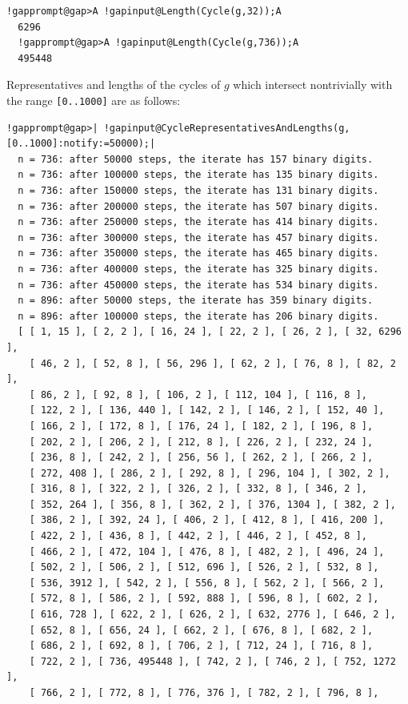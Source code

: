 \documentclass[a4paper,11pt]{report}
\begin{document}
{{\begin{Verbatim}[commandchars=!@A,fontsize=\small,frame=single,label=Example]
  !gapprompt@gap>A !gapinput@Length(Cycle(g,32));A
  6296
  !gapprompt@gap>A !gapinput@Length(Cycle(g,736));A
  495448
\end{Verbatim}
 Representatives and lengths of the cycles of $g$ which intersect nontrivially with the range \texttt{[0..1000]} are as follows: 
\begin{Verbatim}[commandchars=!@|,fontsize=\small,frame=single,label=Example]
  !gapprompt@gap>| !gapinput@CycleRepresentativesAndLengths(g,[0..1000]:notify:=50000);|
  n = 736: after 50000 steps, the iterate has 157 binary digits.
  n = 736: after 100000 steps, the iterate has 135 binary digits.
  n = 736: after 150000 steps, the iterate has 131 binary digits.
  n = 736: after 200000 steps, the iterate has 507 binary digits.
  n = 736: after 250000 steps, the iterate has 414 binary digits.
  n = 736: after 300000 steps, the iterate has 457 binary digits.
  n = 736: after 350000 steps, the iterate has 465 binary digits.
  n = 736: after 400000 steps, the iterate has 325 binary digits.
  n = 736: after 450000 steps, the iterate has 534 binary digits.
  n = 896: after 50000 steps, the iterate has 359 binary digits.
  n = 896: after 100000 steps, the iterate has 206 binary digits.
  [ [ 1, 15 ], [ 2, 2 ], [ 16, 24 ], [ 22, 2 ], [ 26, 2 ], [ 32, 6296 ], 
    [ 46, 2 ], [ 52, 8 ], [ 56, 296 ], [ 62, 2 ], [ 76, 8 ], [ 82, 2 ], 
    [ 86, 2 ], [ 92, 8 ], [ 106, 2 ], [ 112, 104 ], [ 116, 8 ], 
    [ 122, 2 ], [ 136, 440 ], [ 142, 2 ], [ 146, 2 ], [ 152, 40 ], 
    [ 166, 2 ], [ 172, 8 ], [ 176, 24 ], [ 182, 2 ], [ 196, 8 ], 
    [ 202, 2 ], [ 206, 2 ], [ 212, 8 ], [ 226, 2 ], [ 232, 24 ], 
    [ 236, 8 ], [ 242, 2 ], [ 256, 56 ], [ 262, 2 ], [ 266, 2 ], 
    [ 272, 408 ], [ 286, 2 ], [ 292, 8 ], [ 296, 104 ], [ 302, 2 ], 
    [ 316, 8 ], [ 322, 2 ], [ 326, 2 ], [ 332, 8 ], [ 346, 2 ], 
    [ 352, 264 ], [ 356, 8 ], [ 362, 2 ], [ 376, 1304 ], [ 382, 2 ], 
    [ 386, 2 ], [ 392, 24 ], [ 406, 2 ], [ 412, 8 ], [ 416, 200 ], 
    [ 422, 2 ], [ 436, 8 ], [ 442, 2 ], [ 446, 2 ], [ 452, 8 ], 
    [ 466, 2 ], [ 472, 104 ], [ 476, 8 ], [ 482, 2 ], [ 496, 24 ], 
    [ 502, 2 ], [ 506, 2 ], [ 512, 696 ], [ 526, 2 ], [ 532, 8 ], 
    [ 536, 3912 ], [ 542, 2 ], [ 556, 8 ], [ 562, 2 ], [ 566, 2 ], 
    [ 572, 8 ], [ 586, 2 ], [ 592, 888 ], [ 596, 8 ], [ 602, 2 ], 
    [ 616, 728 ], [ 622, 2 ], [ 626, 2 ], [ 632, 2776 ], [ 646, 2 ], 
    [ 652, 8 ], [ 656, 24 ], [ 662, 2 ], [ 676, 8 ], [ 682, 2 ], 
    [ 686, 2 ], [ 692, 8 ], [ 706, 2 ], [ 712, 24 ], [ 716, 8 ], 
    [ 722, 2 ], [ 736, 495448 ], [ 742, 2 ], [ 746, 2 ], [ 752, 1272 ], 
    [ 766, 2 ], [ 772, 8 ], [ 776, 376 ], [ 782, 2 ], [ 796, 8 ], 

\end{Verbatim}}}
\end{document}
